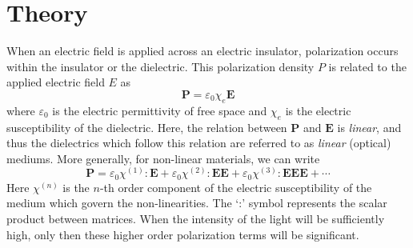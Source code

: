 \documentclass[%
 reprint,
 amsmath,amssymb,
 aps,
]{revtex4-2}
\begin{document}
	
	

\section{Theory}
	When an electric field is applied across an electric insulator, polarization occurs within the insulator or the dielectric. This polarization density $ P $ is related to the applied electric field $ E $ as
	\begin{equation}
		\mathbf{P} = \varepsilon_0 \chi_e \mathbf{E}
	\end{equation}
	where $ \varepsilon_0 $ is the electric permittivity of free space and $ \chi_e $ is the electric susceptibility of the dielectric. Here, the relation between $ \mathbf{P} $ and $ \mathbf{E} $ is \textit{linear}, and thus the dielectrics which follow this relation are referred to as \textit{linear} (optical) mediums. More generally, for non-linear materials, we can write
	\begin{equation}\label{eq:2}
		\mathbf{P} = \varepsilon_0 \chi^{(1)} : \mathbf{E} + \varepsilon_0 \chi^{(2)} : \mathbf{EE} + \varepsilon_0 \chi^{(3)} : \mathbf{EEE} + \cdots
	\end{equation}
	Here $ \chi^{(n)} $ is the $ n $-th order component of the electric susceptibility of the medium which govern the non-linearities. The `:' symbol represents the scalar product between matrices. When the intensity of the light will be sufficiently high, only then
	these higher order polarization terms will be significant.
	
\end{document}

